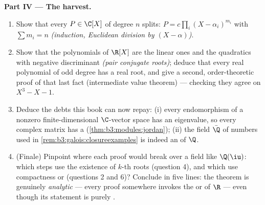 \begin{problem}
\medskip
\noindent\textbf{Part IV --- The harvest.}
\begin{enumerate}[resume]
  \item Show that every $P \in \C[X]$ of degree $n$ splits:
        $P = c\prod_{i}(X - \alpha_i)^{m_i}$ with $\sum m_i =
        n$ \emph{(induction, Euclidean division by $(X -
        \alpha)$)}.
  \item Show that the  polynomials of $\R[X]$ are
        the linear ones and the quadratics with negative
        discriminant \emph{(pair conjugate roots)}; deduce
        that every real polynomial of odd degree has a real
        root, and give a second, order-theoretic proof of
        that last fact (intermediate value theorem) ---
        checking they agree on $X^3 - X - 1$.
  \item Deduce the debts this book can now repay: (i) every
        endomorphism of a nonzero finite-dimensional
        $\C$-vector space has an eigenvalue, so every complex
        matrix has a 
        (\cref{thm:b3:modules:jordan}); (ii) the field
        $\bar\Q$ of  numbers used in
        \cref{rem:b3:galois:closureexamples} is indeed an
         of $\Q$.
  \item (Finale) Pinpoint where each proof would break over a
        field like $\Q(\iu)$: which steps use the existence of
        $k$-th roots (question 4), and which use compactness
        or  (questions 2 and 6)? Conclude in five
        lines: the theorem is genuinely \emph{analytic} ---
        every proof somewhere invokes the  or
         of $\R$ --- even though its statement is
        purely .
\end{enumerate}


\end{problem}

